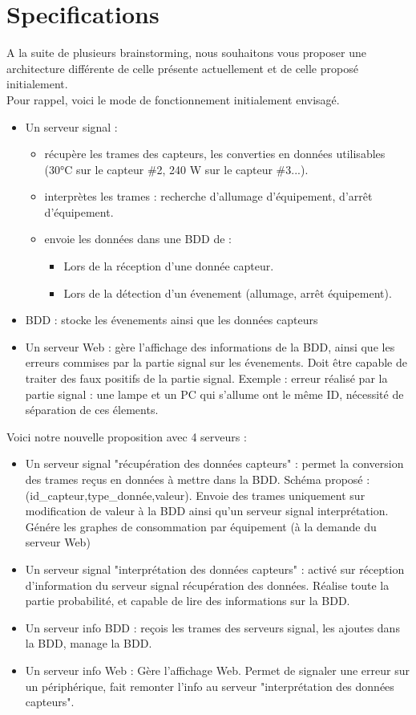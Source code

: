 \documentclass[10pt,a4paper]{article}
\begin{document}
\section{Specifications}
A la suite de plusieurs brainstorming, nous souhaitons vous proposer une architecture différente de celle présente actuellement et de celle proposé initialement.\\
Pour rappel, voici le mode de fonctionnement initialement envisagé.
\begin{itemize}
  \item Un serveur signal :
  \begin{itemize}
    \item récupère les trames des capteurs, les converties en données utilisables (30°C sur le capteur \#2, 240 W sur le capteur \#3...).
    \item interprètes les trames : recherche d'allumage d'équipement, d'arrêt d'équipement.
    \item envoie les données dans une BDD de :
    \begin{itemize}
      \item Lors de la réception d'une donnée capteur.
      \item Lors de la détection d'un évenement (allumage, arrêt équipement).
    \end{itemize}
  \end{itemize}
  \item BDD : stocke les évenements ainsi que les données capteurs
  \item Un serveur Web : gère l'affichage des informations de la BDD, ainsi que les erreurs commises par la partie signal sur les évenements. Doit être capable de traiter des faux positifs de la partie signal. Exemple : erreur réalisé par la partie signal : une lampe et un PC qui s'allume ont le même ID, nécessité de séparation de ces élements.
\end{itemize}
Voici notre nouvelle proposition avec 4 serveurs :
\begin{itemize}
  \item Un serveur signal "récupération des données capteurs" : permet la conversion des trames reçus en données à mettre dans la BDD. Schéma proposé : (id\_capteur,type\_donnée,valeur). Envoie des trames uniquement sur modification de valeur à la BDD ainsi qu'un serveur signal interprétation. Génére les graphes de consommation par équipement (à la demande du serveur Web)
  \item Un serveur signal "interprétation des données capteurs" : activé sur réception d'information du serveur signal récupération des données. Réalise toute la partie probabilité, et capable de lire des informations sur la BDD.
  \item Un serveur info BDD : reçois les trames des serveurs signal, les ajoutes dans la BDD, manage la BDD.
  \item Un serveur info Web : Gère l'affichage Web. Permet de signaler une erreur sur un périphérique, fait remonter l'info au serveur "interprétation des données capteurs".
\end{itemize}
\end{document}
